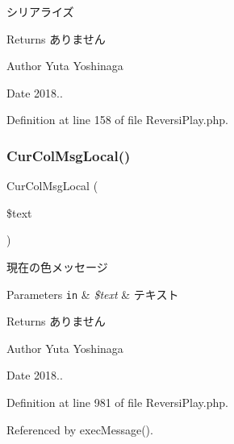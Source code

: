 シリアライズ 

\begin{DoxyReturn}{Returns}
ありません 
\end{DoxyReturn}
\begin{DoxyAuthor}{Author}
Yuta Yoshinaga 
\end{DoxyAuthor}
\begin{DoxyDate}{Date}
2018.. 
\end{DoxyDate}


Definition at line 158 of file Reversi\+Play.\+php.

\mbox{\label{class_reversi_play_aa217a221907e90c97719f8332c60a6d6}} 
\subsubsection{\texorpdfstring{Cur\+Col\+Msg\+Local()}{CurColMsgLocal()}}
{\footnotesize\ttfamily Cur\+Col\+Msg\+Local (\begin{DoxyParamCaption}\item[{}]{\$text }\end{DoxyParamCaption})\hspace{0.3cm}{\ttfamily [private]}}



現在の色メッセージ 


\begin{DoxyParams}[1]{Parameters}
\mbox{\tt in}  & {\em \$text} & テキスト \\
\hline
\end{DoxyParams}
\begin{DoxyReturn}{Returns}
ありません 
\end{DoxyReturn}
\begin{DoxyAuthor}{Author}
Yuta Yoshinaga 
\end{DoxyAuthor}
\begin{DoxyDate}{Date}
2018.. 
\end{DoxyDate}


Definition at line 981 of file Reversi\+Play.\+php.



Referenced by exec\+Message().

